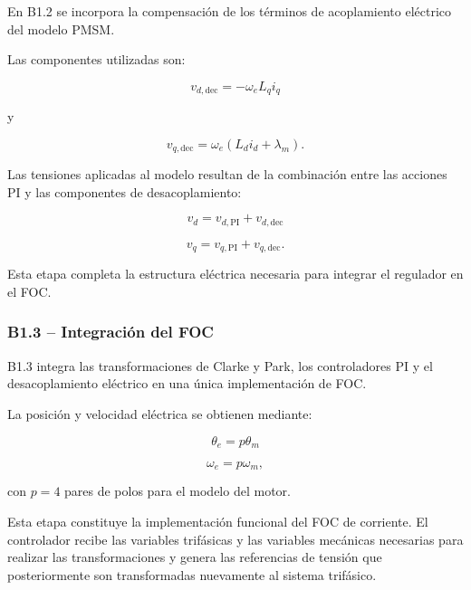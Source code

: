 En B1.2 se incorpora la compensación de los términos de acoplamiento eléctrico del modelo PMSM.

Las componentes utilizadas son:

\begin{equation}
v_{d,\mathrm{dec}}
=
-\omega_e L_q i_q
\end{equation}

y

\begin{equation}
v_{q,\mathrm{dec}}
=
\omega_e
\left(
L_d i_d+\lambda_m
\right).
\end{equation}

Las tensiones aplicadas al modelo resultan de la combinación entre las acciones PI y las componentes de desacoplamiento:

\begin{equation}
v_d=v_{d,\mathrm{PI}}+v_{d,\mathrm{dec}}
\end{equation}

\begin{equation}
v_q=v_{q,\mathrm{PI}}+v_{q,\mathrm{dec}}.
\end{equation}

Esta etapa completa la estructura eléctrica necesaria para integrar el regulador en el FOC.

\subsubsection{B1.3 -- Integración del FOC}

B1.3 integra las transformaciones de Clarke y Park, los controladores PI y el desacoplamiento eléctrico en una única implementación de FOC.

La posición y velocidad eléctrica se obtienen mediante:

\begin{equation}
\theta_e=p\theta_m
\end{equation}

\begin{equation}
\omega_e=p\omega_m,
\end{equation}

con \(p=4\) pares de polos para el modelo del motor.

Esta etapa constituye la implementación funcional del FOC de corriente. El controlador recibe las variables trifásicas y las variables mecánicas necesarias para realizar las transformaciones y genera las referencias de tensión que posteriormente son transformadas nuevamente al sistema trifásico.


